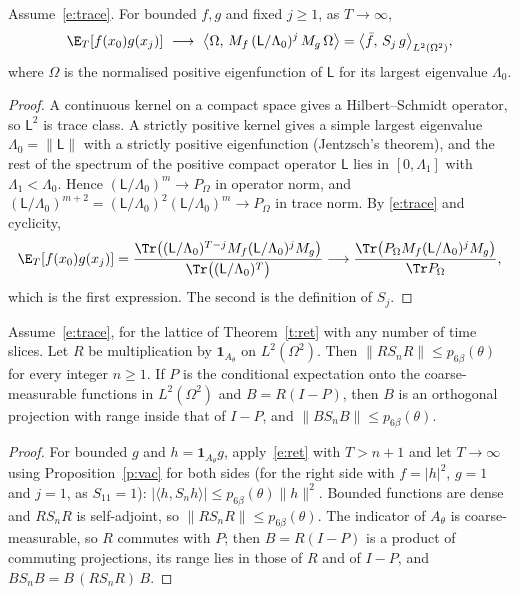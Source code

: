 \begin{proposition}\label{p:vac}
Assume~\eqref{e:trace}. For bounded $f,g$ and fixed $j\ge1$, as $T\to\infty$,
\[
\E_T[f(x_0)g(x_j)]\ \longrightarrow\ \big\langle\Omega,\,M_f\,(\mathsf L/\Lambda_0)^j\,M_g\,\Omega\big\rangle
=\big\langle\bar f,\,S_j\,g\big\rangle_{L^2(\Omega^2)} ,
\]
where $\Omega$ is the normalised positive eigenfunction of $\mathsf L$ for its largest eigenvalue $\Lambda_0$.
\end{proposition}
\begin{proof}
A continuous kernel on a compact space gives a Hilbert--Schmidt operator, so $\mathsf L^2$ is trace class.
A strictly positive kernel gives a simple largest eigenvalue $\Lambda_0=\|\mathsf L\|$ with a strictly positive
eigenfunction (Jentzsch's theorem), and the rest of the spectrum of the positive compact operator $\mathsf L$
lies in $[0,\Lambda_1]$ with $\Lambda_1<\Lambda_0$. Hence $(\mathsf L/\Lambda_0)^m\to P_\Omega$ in operator norm,
and $(\mathsf L/\Lambda_0)^{m+2}=(\mathsf L/\Lambda_0)^2(\mathsf L/\Lambda_0)^m\to P_\Omega$ in trace norm. By
\eqref{e:trace} and cyclicity,
\[
\E_T[f(x_0)g(x_j)]=\frac{\Tr\big((\mathsf L/\Lambda_0)^{T-j}M_f(\mathsf L/\Lambda_0)^jM_g\big)}{\Tr\big((\mathsf L/\Lambda_0)^T\big)}
\longrightarrow\frac{\Tr\big(P_\Omega M_f(\mathsf L/\Lambda_0)^jM_g\big)}{\Tr P_\Omega},
\]
which is the first expression. The second is the definition of $S_j$.
\end{proof}

\begin{corollary}\label{c:vac}
Assume~\eqref{e:trace}, for the lattice of Theorem~\ref{t:ret} with any number of time slices. Let $R$ be
multiplication by $\mathbf 1_{A_\theta}$ on $L^2(\Omega^2)$. Then $\|RS_nR\|\le p_{6\beta}(\theta)$ for every
integer $n\ge1$. If $P$ is the conditional expectation onto the coarse-measurable functions in
$L^2(\Omega^2)$ and $B=R(I-P)$, then $B$ is an orthogonal projection with range inside that of $I-P$, and
$\|BS_nB\|\le p_{6\beta}(\theta)$.
\end{corollary}
\begin{proof}
For bounded $g$ and $h=\mathbf 1_{A_\theta}g$, apply~\eqref{e:ret} with $T>n+1$ and let $T\to\infty$ using
Proposition~\ref{p:vac} for both sides (for the right side with $f=|h|^2$, $g=1$ and $j=1$, as $S_11=1$): $|\langle h,S_nh\rangle|\le p_{6\beta}(\theta)\|h\|^2$. Bounded functions
are dense and $RS_nR$ is self-adjoint, so $\|RS_nR\|\le p_{6\beta}(\theta)$. The indicator of $A_\theta$ is
coarse-measurable, so $R$ commutes with $P$; then $B=R(I-P)$ is a product of commuting projections, its range
lies in those of $R$ and of $I-P$, and $BS_nB=B\,(RS_nR)\,B$.
\end{proof}

